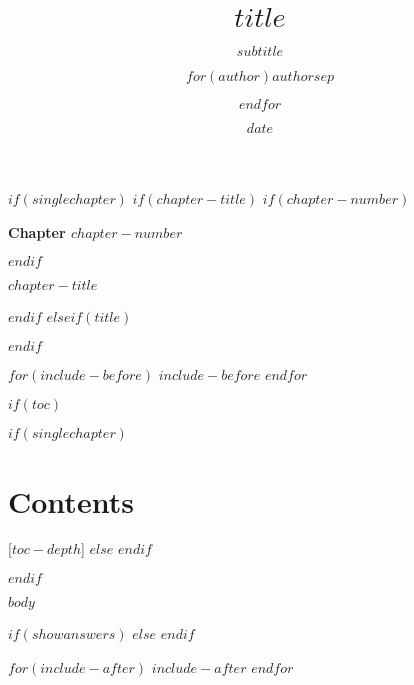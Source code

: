 \documentclass[11pt,oneside]{book}
\title{$title$}
\subtitle{$subtitle$}
\author{$for(author)$$author$$sep$ \and $endfor$}
\date{$date$}
\begin{document}
$if(singlechapter)$
$if(chapter-title)$
$if(chapter-number)$
\setcounter{chapter}{$chapter-number$}
{\noindent\LARGE\bfseries Chapter $chapter-number$ \par\bigskip}
$endif$
{\noindent\Huge\bfseries $chapter-title$ \par\bigskip}
$endif$
$elseif(title)$
\maketitle
$endif$

$for(include-before)$
$include-before$
$endfor$

$if(toc)$
{
$if(singlechapter)$
\section*{Contents}
\startcontents
{}[$toc-depth$]{}
$else$
\setcounter{tocdepth}{$toc-depth$}
\tableofcontents
$endif$
}
$endif$

$body$

$if(showanswers)$
$else$
$endif$

$for(include-after)$
$include-after$
$endfor$
\end{document}
